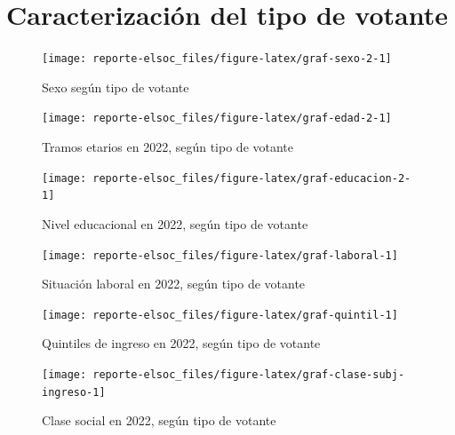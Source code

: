 \documentclass[
  12pt,
]{book}
\begin{document}
\hypertarget{caracterizaciuxf3n-del-tipo-de-votante}{%
\section{Caracterización del tipo de votante}\label{caracterizaciuxf3n-del-tipo-de-votante}}

\begin{figure}

{\centering \texttt{[image: reporte-elsoc\_files/figure-latex/graf-sexo-2-1]} 

}

\caption{Sexo según tipo de votante}\label{fig:graf-sexo-2}
\end{figure}

\begin{figure}

{\centering \texttt{[image: reporte-elsoc\_files/figure-latex/graf-edad-2-1]} 

}

\caption{Tramos etarios en 2022, según tipo de votante}\label{fig:graf-edad-2}
\end{figure}

\begin{figure}

{\centering \texttt{[image: reporte-elsoc\_files/figure-latex/graf-educacion-2-1]} 

}

\caption{Nivel educacional en 2022, según tipo de votante}\label{fig:graf-educacion-2}
\end{figure}

\begin{figure}

{\centering \texttt{[image: reporte-elsoc\_files/figure-latex/graf-laboral-1]} 

}

\caption{Situación laboral en 2022, según tipo de votante}\label{fig:graf-laboral}
\end{figure}

\begin{figure}

{\centering \texttt{[image: reporte-elsoc\_files/figure-latex/graf-quintil-1]} 

}

\caption{Quintiles de ingreso en 2022, según tipo de votante}\label{fig:graf-quintil}
\end{figure}

\begin{figure}

{\centering \texttt{[image: reporte-elsoc\_files/figure-latex/graf-clase-subj-ingreso-1]} 

}

\caption{Clase social en 2022, según tipo de votante}\label{fig:graf-clase-subj-ingreso}
\end{figure}
\end{document}
